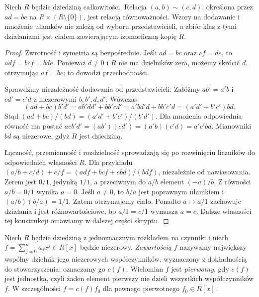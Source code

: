 \begin{lemat}
\label{aa:lem:fracfield-well-defined}
Niech $R$ będzie dziedziną całkowitości. Relacja
$(a,b)\sim(c,d)$, określona przez $ad=bc$ na
$R\times(R\setminus\{0\})$, jest relacją równoważności.
Wzory na dodawanie i mnożenie ułamków nie zależą od
wyboru przedstawicieli, a zbiór klas z tymi działaniami
jest ciałem zawierającym izomorficzną kopię $R$.
\end{lemat}
\begin{proof}
Zwrotność i symetria są bezpośrednie. Jeśli
$ad=bc$ oraz $cf=de$, to $adf=bcf=bde$.
Ponieważ $d\ne0$ i $R$ nie ma dzielników zera,
możemy skrócić $d$, otrzymując $af=be$;
to dowodzi przechodniości.

Sprawdźmy niezależność dodawania od przedstawicieli.
Załóżmy $ab'=a'b$ i $cd'=c'd$ z niezerowymi
$b,b',d,d'$. Wówczas
\[
 (ad+bc)b'd'=ab'dd'+bb'cd'
             =a'bd'd+bb'c'd
             =(a'd'+b'c')bd.
\]
Stąd $(ad+bc)/(bd)=(a'd'+b'c')/(b'd')$.
Dla mnożenia odpowiednia równość ma postać
$acb'd'=(ab')(cd')=(a'b)(c'd)=a'c'bd$.
Mianowniki $bd$ są niezerowe, gdyż $R$ jest dziedziną.

Łączność, przemienność i rozdzielność sprowadzają się
po rozwinięciu liczników do odpowiednich własności $R$.
Dla przykładu
$(a/b+c/d)+e/f=(adf+bcf+ebd)/(bdf)$, niezależnie
od nawiasowania. Zerem jest $0/1$, jedynką $1/1$,
a przeciwnym do $a/b$ element $(-a)/b$.
Z równości $a/b=0/1$ wynika $a=0$.
Jeśli $a\ne0$, to $b/a$ jest poprawnym ułamkiem
i $(a/b)(b/a)=1/1$. Zatem otrzymujemy ciało.
Ponadto $a\mapsto a/1$ zachowuje działania i jest
różnowartościowe, bo $a/1=c/1$ wymusza $a=c$.
Dalsze własności tej konstrukcji omawiamy w
dalszej części skryptu.
\end{proof}

\begin{definicja}
\label{aa:def:poly-content}
Niech $R$ będzie dziedziną z jednoznacznym rozkładem
na czynniki i niech $f=\sum_{j=0}^n a_jx^j\in R[x]$
będzie niezerowy. \emph{Zawartością} $f$ nazywamy
największy wspólny dzielnik jego niezerowych współczynników,
wyznaczony z dokładnością do stowarzyszenia; oznaczamy go
$c(f)$. Wielomian $f$ jest \emph{pierwotny}, gdy $c(f)$
jest jednostką, czyli żaden element pierwszy nie dzieli
wszystkich współczynników $f$. W szczególności
$f=c(f)f_0$ dla pewnego pierwotnego $f_0\in R[x]$.
\end{definicja}

